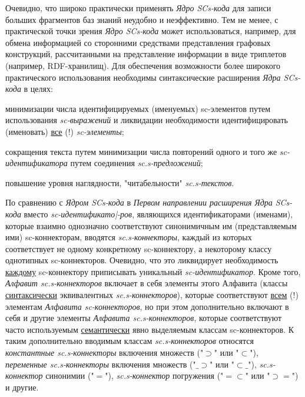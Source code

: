 Очевидно, что широко практически применять \textit{Ядро SCs-кода} для записи больших фрагментов баз знаний неудобно и неэффективно. Тем не менее, с практической точки зрения \textit{Ядро SCs-кода} может использоваться, например, для обмена информацией со сторонними средствами представления графовых конструкций, рассчитанными на представление информации в виде триплетов (например, RDF-хранилищ).
Для обеспечения возможности более широкого практического использования необходимы синтаксические расширения \textit{Ядра SCs-кода} в целях:
\begin{textitemize}
	\item минимизации числа идентифицируемых (именуемых) sc-элементов путем использования \textit{sc-выражений} и ликвидации необходимости идентифицировать (именовать) \uline{все} (!) \textit{sc-элементы};
	\item сокращения текста путем минимизации числа повторений одного и того же \textit{sc-идентификатора} путем соединения \textit{sc.s-предложений};
	\item повышение уровня наглядности, "читабельности"{} \textit{sc.s-текстов}.
\end{textitemize}

\begin{SCn}
\end{SCn}

По сравнению с \textit{Ядром SCs-кода} в \textit{Первом направлении расширения Ядра SCs-кода} вместо \textit{sc-идентификато|-ров}, являющихся идентификаторами (именами), которые взаимно однозначно соответствуют синонимичным им (представляемым ими) sc-коннекторам, вводятся \textit{sc.s-коннекторы}, каждый из которых соответствует не одному конкретному sc-коннектору, а некоторому классу однотипных sc-коннекторов. Очевидно, что это ликвидирует необходимость \uline{каждому} sc-коннектору приписывать уникальный \textit{sc-идентификатор}. Кроме того, \textit{Алфавит sc.s-коннекторов\scnsupergroupsign} включает в себя элементы этого Алфавита (классы \uline{синтаксически} эквивалентных \textit{sc.s-коннекторов}), которые соответствуют \uline{всем} (!) элементам \textit{Алфавита sc-коннекторов\scnsupergroupsign}, но при этом дополнительно включают в себя и другие элементы \textit{Алфавита sc.s-коннекторов\scnsupergroupsign}, которые соответствуют часто используемым \uline{семантически} явно выделяемым классам sc-коннекторов. К таким дополнительно вводимым классам \textit{sc.s-коннекторов} относятся \textit{константные sc.s-коннекторы} включения множеств ("$\supset$"{} или "$\subset$"{}), \textit{переменные sc.s-коннекторы} включения множеств ("$\_\supset$"{} или "$\subset\_$"{}), \textit{sc.s-коннектор} синонимии ("$=$"{}), \textit{sc.s-коннектор} погружения ("$=\subset$"{} или "$\supset=$"{}) и другие.

